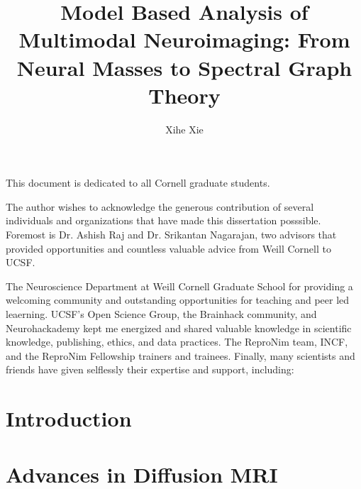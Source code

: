 \documentclass[phd,tocprelim]{cornell}
\title {Model Based Analysis of Multimodal Neuroimaging: From Neural Masses to Spectral Graph Theory}
\author {Xihe Xie}
\begin{document}
\maketitle
\makecopyright

\begin{abstract}

\end{abstract}


\begin{dedication}
This document is dedicated to all Cornell graduate students.
\end{dedication}

\begin{acknowledgements}
The author wishes to acknowledge the generous contribution of several individuals and organizations that have made this dissertation posssible. Foremost is Dr. Ashish Raj and Dr. Srikantan Nagarajan, two advisors that provided opportunities and countless valuable advice from Weill Cornell to UCSF. 

The Neuroscience Department at Weill Cornell Graduate School for providing a welcoming community and outstanding opportunities for teaching and peer led leaerning. UCSF's Open Science Group, the Brainhack community, and Neurohackademy kept me energized and shared valuable knowledge in scientific knowledge, publishing, ethics, and data practices. The ReproNim team, INCF, and the ReproNim Fellowship trainers and trainees. Finally, many scientists and friends have given selflessly their expertise and support, including: 
\end{acknowledgements}

\contentspage
\tablelistpage
\figurelistpage

\normalspacing \setcounter{page}{1} 
\pagestyle{cornell} \addtolength{\parskip}{0.5\baselineskip}

\chapter{Introduction}


\chapter{Advances in Diffusion MRI}

\end{document}
